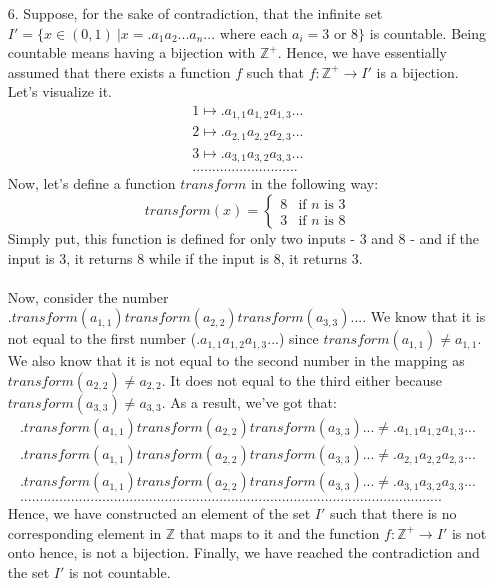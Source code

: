 \documentclass[12pt, a4paper]{article}
\newcommand{\ints}{\mathbb{Z}}
\newcommand{\pints}{\mathbb{Z}^+}
\newcommand{\rarr}{\rightarrow}
\begin{document}
\begin{itemize}
\item[6.]
Suppose, for the sake of contradiction, that the infinite set $I' = \{x \in (0, 1) \ | x = .a_1a_2...a_n... \mbox{ where each $a_i = 3$ or 8}\}$ is countable.
Being countable means having a bijection with $\pints$. Hence, we have essentially assumed that there exists a function $f$ such that
$f : \pints \rarr I'$ is a bijection. Let's visualize it.
\begin{align*}
1 \mapsto .a_{1,1}a_{1,2}a_{1,3}...\\
2 \mapsto .a_{2,1}a_{2,2}a_{2,3}...\\
3 \mapsto .a_{3,1}a_{3,2}a_{3,3}...\\
...........................
\end{align*}
Now, let's define a function $transform$ in the following way:
$$transform(x) = \begin{cases} 8 & \mbox{if } n\mbox{ is 3} \\ 3 & \mbox{if } n\mbox{ is 8} \end{cases}$$
Simply put, this function is defined for only two inputs - 3 and 8 - and if the input is 3, it returns 8 while
if the input is 8, it returns 3.\\\\
Now, consider the number $.transform(a_{1,1})transform(a_{2,2})transform(a_{3,3})...$. We know that it is not equal
to the first number ($.a_{1,1}a_{1,2}a_{1,3}...$) since $transform(a_{1,1}) \neq a_{1,1}$. We also know that it is not equal
to the second number in the mapping as $transform(a_{2,2}) \neq a_{2,2}$. It does not equal to the third either because $transform(a_{3,3}) \neq a_{3,3}$.
As a result, we've got that:
\begin{align*}
.transform(a_{1,1})transform(a_{2,2})transform(a_{3,3})... \neq .a_{1,1}a_{1,2}a_{1,3}...\\
.transform(a_{1,1})transform(a_{2,2})transform(a_{3,3})... \neq .a_{2,1}a_{2,2}a_{2,3}...\\
.transform(a_{1,1})transform(a_{2,2})transform(a_{3,3})... \neq .a_{3,1}a_{3,2}a_{3,3}...\\
............................................................................................................
\end{align*}
Hence, we have constructed an element of the set $I'$ such that there is no corresponding element in $\ints$ that maps to it and the function $f : \pints \rarr I'$ is not onto hence, is not a bijection.
Finally, we have reached the contradiction and the set $I'$ is not countable.
\end{itemize}
\end{document}
